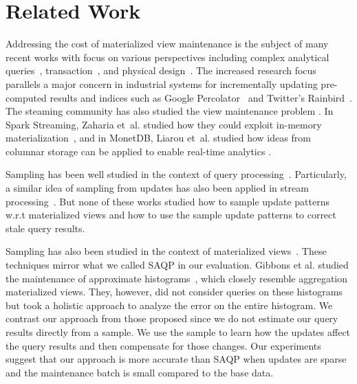 \section{Related Work}\label{related}

Addressing the cost of materialized view maintenance is the subject of many recent works with
focus on various perspectives including complex analytical queries~\cite{nikolic2014linview}, transaction~\cite{bailis2014scalable}, and physical design~\cite{lefevre2014opportunistic}.
The increased research focus parallels a major concern in industrial systems for incrementally updating pre-computed results and indices such as Google Percolator~\cite{percolator} and Twitter's Rainbird~\cite{rainbird}.
The steaming community has also studied the view maintenance problem \cite{abadi2003aurora,golab2011consistency, golab2012scalable, he2010comet, ghanem2010supporting}. In Spark Streaming, Zaharia et~al. studied how they could exploit in-memory materialization~\cite{zaharia2012discretized}, and in MonetDB, Liarou et~al. studied how ideas from columnar storage can be applied to enable real-time analytics \cite{liarou2012monetdb}.


Sampling has been well studied in the context of query processing~\cite{agarwal2013blinkdb, olken1993random, garofalakis2001approximate}. Particularly, a similar idea of sampling from updates has also been applied in stream processing~\cite{tatbul2003load, Garofalakis, rabkin2014aggregation}. But none of these works studied how to sample update patterns w.r.t materialized views and how to use the sample update patterns to correct stale query results.

Sampling has also been studied in the context of materialized views~\cite{joshi2008materialized,DBLP:conf/icde/OlkenR92}.
These techniques mirror what we called SAQP in our evaluation.
Gibbons et al. studied the maintenance of approximate histograms~\cite{gibbons1997fast}, which closely resemble aggregation materialized views.
They, however, did not consider queries on these histograms but took a holistic approach to analyze the error on the entire histogram.
We contrast our approach from those proposed since we do not estimate our query results directly from a sample.
We use the sample to learn how the updates affect the query results and then compensate for those changes.
Our experiments suggest that our approach is more accurate than SAQP when updates are sparse and the maintenance batch is small compared to the base data.

